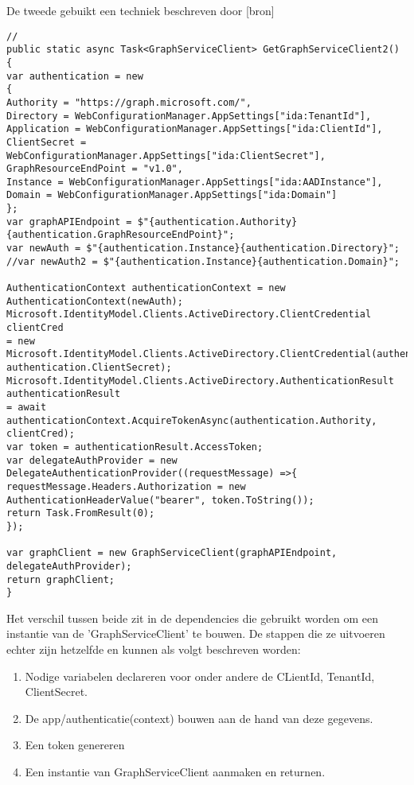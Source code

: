 De tweede gebuikt een techniek beschreven door [bron]
\begin{lstlisting}[style=CSharpStyle]
//
public static async Task<GraphServiceClient> GetGraphServiceClient2()
{
var authentication = new
{
Authority = "https://graph.microsoft.com/",
Directory = WebConfigurationManager.AppSettings["ida:TenantId"],
Application = WebConfigurationManager.AppSettings["ida:ClientId"],
ClientSecret = WebConfigurationManager.AppSettings["ida:ClientSecret"],
GraphResourceEndPoint = "v1.0",
Instance = WebConfigurationManager.AppSettings["ida:AADInstance"],
Domain = WebConfigurationManager.AppSettings["ida:Domain"]
};
var graphAPIEndpoint = $"{authentication.Authority}{authentication.GraphResourceEndPoint}";
var newAuth = $"{authentication.Instance}{authentication.Directory}";
//var newAuth2 = $"{authentication.Instance}{authentication.Domain}";

AuthenticationContext authenticationContext = new AuthenticationContext(newAuth);
Microsoft.IdentityModel.Clients.ActiveDirectory.ClientCredential clientCred 
= new Microsoft.IdentityModel.Clients.ActiveDirectory.ClientCredential(authentication.Application, authentication.ClientSecret);
Microsoft.IdentityModel.Clients.ActiveDirectory.AuthenticationResult authenticationResult 
= await authenticationContext.AcquireTokenAsync(authentication.Authority, clientCred);
var token = authenticationResult.AccessToken;
var delegateAuthProvider = new DelegateAuthenticationProvider((requestMessage) =>{
requestMessage.Headers.Authorization = new AuthenticationHeaderValue("bearer", token.ToString());
return Task.FromResult(0);
});

var graphClient = new GraphServiceClient(graphAPIEndpoint, delegateAuthProvider);
return graphClient;
}
\end{lstlisting}

Het verschil tussen beide zit in de dependencies die gebruikt worden om een instantie van de 'GraphServiceClient' te bouwen. De stappen die ze uitvoeren echter zijn hetzelfde en kunnen als volgt beschreven worden:
\begin{enumerate}
    \item Nodige variabelen declareren voor onder andere de CLientId, TenantId, ClientSecret.
    \item De app/authenticatie(context) bouwen aan de hand van deze gegevens.
    \item Een token genereren
    \item Een instantie van GraphServiceClient aanmaken en returnen.
\end{enumerate}

